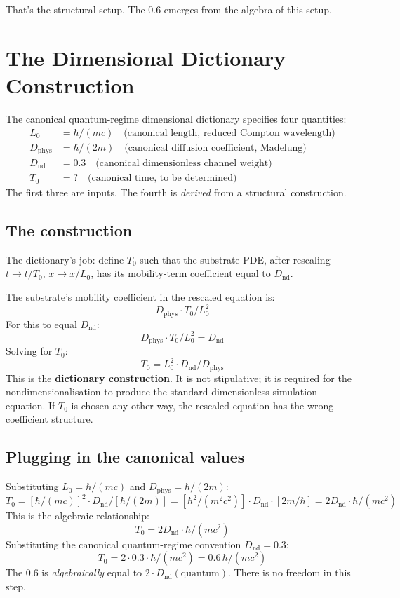 \documentclass[11pt,a4paper]{article}
\begin{document}
That's the structural setup. The 0.6 emerges from the algebra of this setup.

\section{The Dimensional Dictionary Construction}

The canonical quantum-regime dimensional dictionary specifies four quantities:
\[
\begin{aligned}
L_0 &= \hbar/(mc) \quad \text{(canonical length, reduced Compton wavelength)} \\
D_\mathrm{phys} &= \hbar/(2m) \quad \text{(canonical diffusion coefficient, Madelung)} \\
D_\mathrm{nd} &= 0.3 \quad \text{(canonical dimensionless channel weight)} \\
T_0 &= ? \quad \text{(canonical time, to be determined)}
\end{aligned}
\]
The first three are inputs. The fourth is \emph{derived} from a structural construction.

\subsection{The construction}

The dictionary's job: define $T_0$ such that the substrate PDE, after rescaling $t \to t/T_0$, $x \to x/L_0$, has its mobility-term coefficient equal to $D_\mathrm{nd}$.

The substrate's mobility coefficient in the rescaled equation is:
\[
D_\mathrm{phys} \cdot T_0 / L_0^{2}
\]
For this to equal $D_\mathrm{nd}$:
\[
D_\mathrm{phys} \cdot T_0 / L_0^{2} = D_\mathrm{nd}
\]
Solving for $T_0$:
\[
T_0 = L_0^{2} \cdot D_\mathrm{nd} / D_\mathrm{phys}
\]
This is the \textbf{dictionary construction}. It is not stipulative; it is required for the nondimensionalisation to produce the standard dimensionless simulation equation. If $T_0$ is chosen any other way, the rescaled equation has the wrong coefficient structure.

\subsection{Plugging in the canonical values}

Substituting $L_0 = \hbar/(mc)$ and $D_\mathrm{phys} = \hbar/(2m)$:
\[
T_0 = [\hbar/(mc)]^{2} \cdot D_\mathrm{nd} / [\hbar/(2m)] = [\hbar^{2}/(m^{2}c^{2})] \cdot D_\mathrm{nd} \cdot [2m/\hbar] = 2 D_\mathrm{nd} \cdot \hbar/(mc^{2})
\]
This is the algebraic relationship:
\[
\boxed{T_0 = 2 D_\mathrm{nd} \cdot \hbar/(mc^{2})}
\]
Substituting the canonical quantum-regime convention $D_\mathrm{nd} = 0.3$:
\[
T_0 = 2 \cdot 0.3 \cdot \hbar/(mc^{2}) = 0.6\, \hbar/(mc^{2})
\]
The 0.6 is \emph{algebraically} equal to $2 \cdot D_\mathrm{nd}(\mathrm{quantum})$. There is no freedom in this step.
\end{document}
